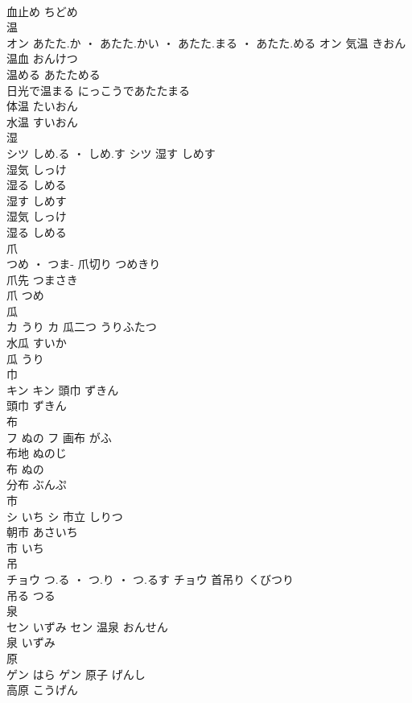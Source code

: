 \documentclass[8pt]{extreport}
\begin{document}
\begin{CJK}{UTF8}{min}
\\	血止め	ちどめ	
\\	温	
\\	オン	あたた.か ・ あたた.かい ・ あたた.まる ・ あたた.める	オン	気温	きおん	
\\	温血	おんけつ	
\\	温める	あたためる	
\\	日光で温まる	にっこうであたたまる	
\\	体温	たいおん	
\\	水温	すいおん	
\\	湿	
\\	シツ	しめ.る ・ しめ.す	シツ	湿す	しめす	
\\	湿気	しっけ	
\\	湿る	しめる	
\\	湿す	しめす	
\\	湿気	しっけ	
\\	湿る	しめる	
\\	爪	
\\	つめ ・ つま-		爪切り	つめきり	
\\	爪先	つまさき	
\\	爪	つめ	
\\	瓜	
\\	カ	うり	カ	瓜二つ	うりふたつ	
\\	水瓜	すいか	
\\	瓜	うり	
\\	巾	
\\	キン		キン	頭巾	ずきん	
\\	頭巾	ずきん	
\\	布	
\\	フ	ぬの	フ	画布	がふ	
\\	布地	ぬのじ	
\\	布	ぬの	
\\	分布	ぶんぷ	
\\	市	
\\	シ	いち	シ	市立	しりつ	
\\	朝市	あさいち	
\\	市	いち	
\\	吊	
\\	チョウ	つ.る ・ つ.り ・ つ.るす	チョウ													首吊り	くびつり	
\\	吊る	つる	
\\	泉	
\\	セン	いずみ	セン	温泉	おんせん	
\\	泉	いずみ	
\\	原	
\\	ゲン	はら	ゲン	原子	げんし	
\\	高原	こうげん	

\end{CJK}
\end{document}
